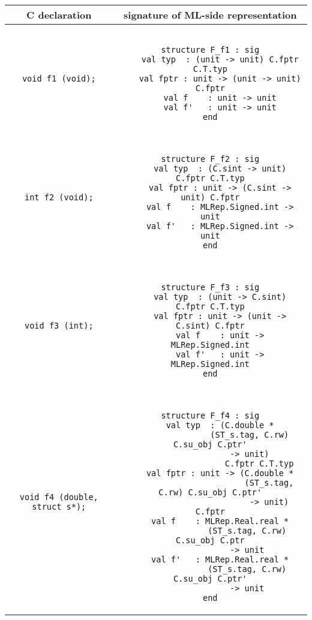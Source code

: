 \documentclass[titlepage,letterpaper]{article}
\begin{document}
\begin{small}
\begin{center}
\begin{tabular}{c|c}
C declaration & signature of ML-side representation \\ \hline\hline
{\tt void f1 (void);}
&
\begin{minipage}{4in}
\begin{verbatim}

structure F_f1 : sig
    val typ  : (unit -> unit) C.fptr C.T.typ
    val fptr : unit -> (unit -> unit) C.fptr
    val f    : unit -> unit
    val f'   : unit -> unit
end

\end{verbatim}
\end{minipage}
\\ \hline
{\tt int f2 (void);}
&
\begin{minipage}{4in}
\begin{verbatim}

structure F_f2 : sig
    val typ  : (C.sint -> unit) C.fptr C.T.typ
    val fptr : unit -> (C.sint -> unit) C.fptr
    val f    : MLRep.Signed.int -> unit
    val f'   : MLRep.Signed.int -> unit
end

\end{verbatim}
\end{minipage}
\\ \hline
{\tt void f3 (int);}
&
\begin{minipage}{4in}
\begin{verbatim}

structure F_f3 : sig
    val typ  : (unit -> C.sint) C.fptr C.T.typ
    val fptr : unit -> (unit -> C.sint) C.fptr
    val f    : unit -> MLRep.Signed.int
    val f'   : unit -> MLRep.Signed.int
end

\end{verbatim}
\end{minipage}
\\ \hline
{\tt void f4 (double, struct s*);}
&
\begin{minipage}{4in}
\begin{verbatim}

structure F_f4 : sig
    val typ  : (C.double *
                (ST_s.tag, C.rw) C.su_obj C.ptr'
                -> unit)
                    C.fptr C.T.typ
    val fptr : unit -> (C.double *
                        (ST_s.tag, C.rw) C.su_obj C.ptr'
                        -> unit) C.fptr
    val f    : MLRep.Real.real *
               (ST_s.tag, C.rw) C.su_obj C.ptr
               -> unit
    val f'   : MLRep.Real.real *
               (ST_s.tag, C.rw) C.su_obj C.ptr'
               -> unit
end

\end{verbatim}
\end{minipage}
\end{tabular}
\end{center}
\end{small}
\end{document}
